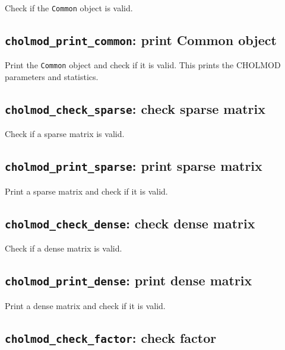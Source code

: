 \documentclass[11pt]{article}
\begin{document}

Check if the {\tt Common} object is valid.

\subsection{{\tt cholmod\_print\_common}: print Common object}


Print the {\tt Common} object and check if it is valid.
This prints the CHOLMOD parameters and statistics.

\subsection{{\tt cholmod\_check\_sparse}: check sparse matrix}


Check if a sparse matrix is valid.

\subsection{{\tt cholmod\_print\_sparse}: print sparse matrix}


Print a sparse matrix and check if it is valid.

\subsection{{\tt cholmod\_check\_dense}: check dense matrix}


Check if a dense matrix is valid.

\subsection{{\tt cholmod\_print\_dense}: print dense matrix}


Print a dense matrix and check if it is valid.

\subsection{{\tt cholmod\_check\_factor}: check factor}
\end{document}
